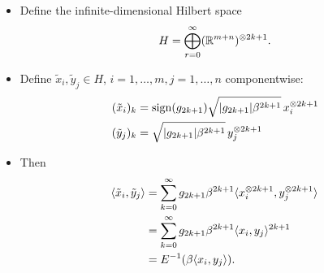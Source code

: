 	\begin{frame}
		\begin{pbmr}
			\begin{itemize}
				\item<1-> Define the infinite-dimensional Hilbert space
					\begin{equation}
						H= \bigoplus_{r=0}^\infty (\mathbb{R}^{m+n})^{\otimes 2k+1}.
					\end{equation}
				\item<2-> Define $\tilde{x}_i, \tilde{y}_j\in H$, $i=1,\dots,m,j=1,\dots,n$ componentwise:
					\begin{align}
						(\tilde{x}_i)_k &= \operatorname{sign}(g_{2k+1}) \sqrt{{\left|{g_{2k+1}}\right|}\beta^{2k+1}}\, x_i^{\otimes 2k+1} \\
						(\tilde{y}_j)_k &= \sqrt{{\left|{g_{2k+1}}\right|}\beta^{2k+1}} \,y_j^{\otimes 2k+1}
					\end{align}
				\item<3-> Then
					\begin{align*}
						\langle{\tilde{x}_i},{\tilde{y}_j}\rangle &= \sum_{k=0}^\infty g_{2k+1} \beta^{2k+1}\langle{x_i^{\ensuremath{\otimes}2k+1}},{y_j^{\otimes 2k+1}}\rangle \\
						&= \sum_{k=0}^\infty g_{2k+1} \beta^{2k+1} \langle{x_i},{y_j}\rangle^{2k+1} \\
						&= E^{-1}(\beta \langle{x_i},{y_j}\rangle).
					\end{align*}
			\end{itemize}
		\end{pbmr}
	\end{frame}
